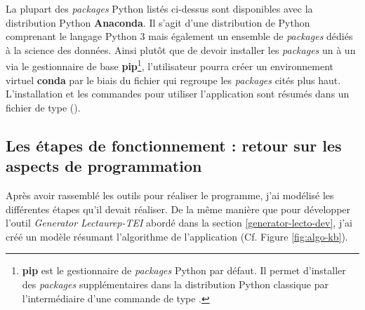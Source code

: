 La plupart des \textit{packages} Python listés ci-dessus sont disponibles avec la distribution Python \textbf{Anaconda}. Il s'agit d'une distribution de Python comprenant le langage Python 3 mais également un ensemble de \textit{packages} dédiés à la science des données. Ainsi plutôt que de devoir installer les \textit{packages} un à un via le gestionnaire de base \textbf{pip}\footnote{\textbf{pip} est le gestionnaire de \textit{packages} Python par défaut. Il permet d'installer des \textit{packages} supplémentaires dans la distribution Python classique par l'intermédiaire d'une commande de type .}, l'utilisateur pourra créer un environnement virtuel \textbf{conda} par le biais du fichier  qui regroupe les \textit{packages} cités plus haut.\\ 

L'installation et les commandes pour utiliser l'application sont résumés dans un fichier de type  ().

\subsection{Les étapes de fonctionnement : retour sur les aspects de programmation}

Après avoir rassemblé les outils pour réaliser le programme, j'ai modélisé les différentes étapes qu'il devait réaliser. De la même manière que pour développer l'outil \textit{Generator Lectaurep-TEI} abordé dans la section \ref{generator-lecto-dev}, j'ai créé un modèle résumant l'algorithme de l'application (Cf. Figure \ref{fig:algo-kb}).\\

